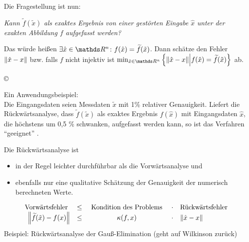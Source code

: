  
Die Fragestellung ist nun:

\textit{Kann $\widetilde{f}(\tilde{x})$ als exaktes Ergebnis
  von einer gestörten Eingabe $\hat{x}$ 
  unter der exakten Abbildung $f$ aufgefasst werden?}

Das würde heißen
$\exists\hat{x}\in\Ren\colon f(\hat{x})=\widetilde{f}(\tilde{x})$.
Dann schätze den Fehler $ \nn[\hat{x}-x]$
bzw. falls $f$ nicht injektiv ist
$\min_{\hat{x}\in \Ren}
\left\{ \nn[\hat{x}-x]\middle\vert 
  f(\hat{x}) = \widetilde{f}(\tilde{x}) 
\right\}$ ab. 

\begin{image}{\copyright}
\end{image}

Ein Anwendungsbeispiel:\\
Die Eingangsdaten seien Messdaten $\tilde{x}$  mit 1\% relativer Genauigkeit. 
Liefert die Rückwärtsanalyse, dass $\widetilde{f} (\tilde{x})$ als exaktes Ergebnis 
$f(\hat x)$ mit Eingangsdaten $\hat x$, 
die höchstens um 0,5 \% schwanken, aufgefasst werden kann,
so ist das Verfahren \enquote{geeignet} . 

Die Rückwärtsanalyse ist
\begin{itemize}
\item in der Regel leichter durchführbar als die
  Vorwärtsanalyse  und 
\item ebenfalls nur eine qualitative Schätzung der
  Genauigkeit der numerisch berechneten Werte.
\end{itemize}

\begin{Beme}
  \begin{gather*}
    \begin{array}{rcccl}
      \text{Vorwärtsfehler } &\leq& \text{ Kondition des Problems }
      &\cdot&\text{Rückwärtsfehler} \\  
      \nn[\widetilde{f}(\tilde{x})-f(x)]&\leq &\kappa(f,x)&\cdot&\nn[\hat{x}-x]
    \end{array}
  \end{gather*}
  Beispiel: Rückwärtsanalyse der Gauß-Elimination
  (geht auf Wilkinson zurück)
\end{Beme}


